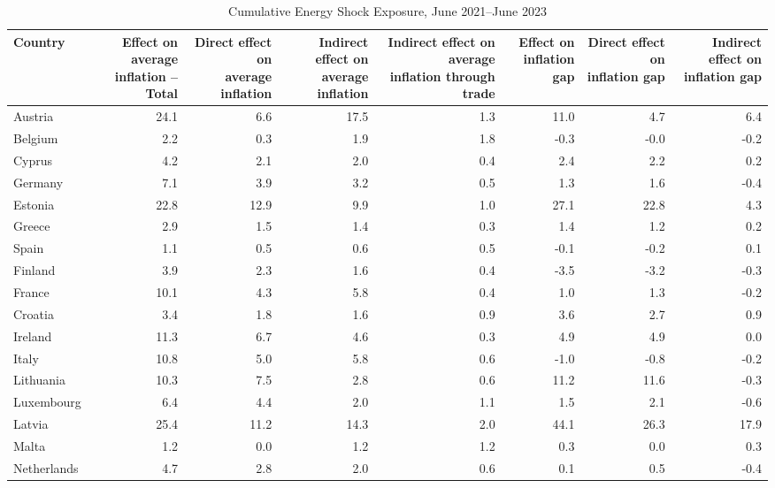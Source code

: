 \documentclass[11pt]{article}
\begin{document}
\setcounter{table}{0}
\begin{table}[H]
\centering
\caption{Cumulative Energy Shock Exposure, June 2021--June 2023}
\scriptsize
\setlength{\tabcolsep}{1.2pt}
\begin{tabular}{lrrrrrrr}
\toprule
Country & \shortstack{Effect on average\\inflation -- Total} & \shortstack{Direct effect on\\average inflation} & \shortstack{Indirect effect on\\average inflation} & \shortstack{Indirect effect on average\\inflation through trade} & \shortstack{Effect on\\inflation gap} & \shortstack{Direct effect on\\inflation gap} & \shortstack{Indirect effect on\\inflation gap}
 \\
\midrule
Austria & 24.1 & 6.6 & 17.5 & 1.3 & 11.0 & 4.7 & 6.4
 \\
Belgium & 2.2 & 0.3 & 1.9 & 1.8 & -0.3 & -0.0 & -0.2
 \\
Cyprus & 4.2 & 2.1 & 2.0 & 0.4 & 2.4 & 2.2 & 0.2
 \\
Germany & 7.1 & 3.9 & 3.2 & 0.5 & 1.3 & 1.6 & -0.4
 \\
Estonia & 22.8 & 12.9 & 9.9 & 1.0 & 27.1 & 22.8 & 4.3
 \\
Greece & 2.9 & 1.5 & 1.4 & 0.3 & 1.4 & 1.2 & 0.2
 \\
Spain & 1.1 & 0.5 & 0.6 & 0.5 & -0.1 & -0.2 & 0.1
 \\
Finland & 3.9 & 2.3 & 1.6 & 0.4 & -3.5 & -3.2 & -0.3
 \\
France & 10.1 & 4.3 & 5.8 & 0.4 & 1.0 & 1.3 & -0.2
 \\
Croatia & 3.4 & 1.8 & 1.6 & 0.9 & 3.6 & 2.7 & 0.9
 \\
Ireland & 11.3 & 6.7 & 4.6 & 0.3 & 4.9 & 4.9 & 0.0
 \\
Italy & 10.8 & 5.0 & 5.8 & 0.6 & -1.0 & -0.8 & -0.2
 \\
Lithuania & 10.3 & 7.5 & 2.8 & 0.6 & 11.2 & 11.6 & -0.3
 \\
Luxembourg & 6.4 & 4.4 & 2.0 & 1.1 & 1.5 & 2.1 & -0.6
 \\
Latvia & 25.4 & 11.2 & 14.3 & 2.0 & 44.1 & 26.3 & 17.9
 \\
Malta & 1.2 & 0.0 & 1.2 & 1.2 & 0.3 & 0.0 & 0.3
 \\
Netherlands & 4.7 & 2.8 & 2.0 & 0.6 & 0.1 & 0.5 & -0.4
 \\

\end{tabular}
\end{table}
\end{document}
